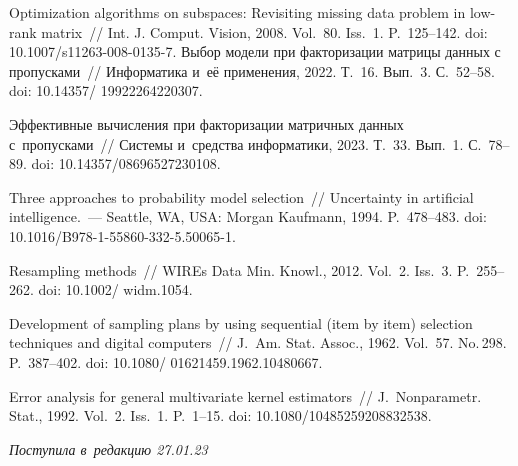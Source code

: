 \begin{multicols}{2}
{\small\frenchspacing
 {\baselineskip=11.5pt
 \begin{thebibliography}{9}
   Optimization algorithms on subspaces: Revisiting missing data problem in  
low-rank matrix~// Int. J. Comput. Vision, 2008. Vol.~80. Iss.~1. P.~125--142. doi: 
10.1007/s11263-008-0135-7.
 Выбор модели при факторизации мат\-ри\-цы данных с пропусками~// 
Информатика и~её применения, 2022. Т.~16. Вып.~3. С.~52--58. doi: 
10.14357/ 19922264220307.
  
   Эффективные вычисления при факторизации матричных данных 
с~пропусками~// Сис\-те\-мы и~средства информатики, 2023. Т.~33. Вып.~1. С.~78--89.
doi: 10.14357/08696527230108.
  
   Three approaches to probability model selection~// 
Uncertainty in artificial intelligence.~---  Seattle, WA, USA: Morgan Kaufmann, 1994. P.~478--483.
  doi: 10.1016/B978-1-55860-332-5.50065-1.
  
 Resampling methods~// WIREs Data Min. 
Knowl., 2012. Vol.~2. Iss.~3. P.~255--262. doi: 10.1002/ widm.1054.
  
 Development of sampling plans by using sequential 
(item by item) selection techniques and digital computers~// J.~Am. Stat. Assoc., 1962. Vol.~57. 
No.\,298. P.~387--402. doi: 10.1080/ 01621459.1962.10480667.
  
   Error analysis for general multivariate kernel estimators~// J.~Nonparametr. 
Stat., 1992. Vol.~2. Iss.~1. P.~1--15. doi: 10.1080/10485259208832538.
\end{thebibliography}

 }
 }

\end{multicols}

\vspace*{-6pt}

\hfill{\small\textit{Поступила в~редакцию 27.01.23}}



\newpage

\vspace*{-28pt}


